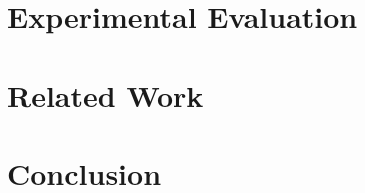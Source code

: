 \documentclass[conference, 10pt]{IEEEtran}
\begin{document}
\section{Experimental Evaluation}
\label{sec:experiments}

\section{Related Work}
\label{sec:related-work}



\cite{ref:ocelot-pact}



\section{Conclusion}
\label{sec:conclusion}



\end{document}
